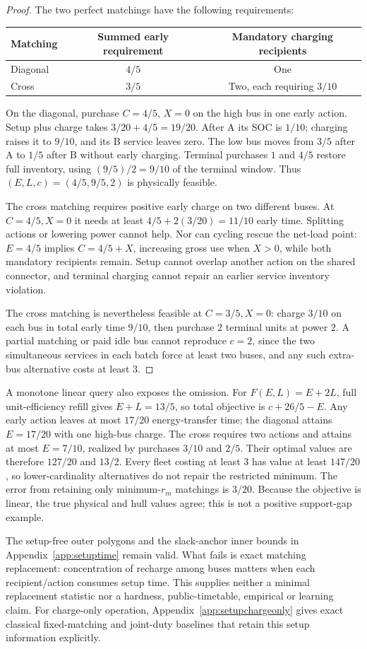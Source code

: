 \begin{proof}
The two perfect matchings have the following requirements:
\begin{center}
\begin{tabular}{lcc}
\toprule
Matching & Summed early requirement & Mandatory charging recipients\\
\midrule
Diagonal & $4/5$ & One\\
Cross & $3/5$ & Two, each requiring $3/10$\\
\bottomrule
\end{tabular}
\end{center}
On the diagonal, purchase $C=4/5$, $X=0$ on the high bus in one
early action. Setup plus charge takes $3/20+4/5=19/20$.
After A its SOC is $1/10$; charging raises it to $9/10$, and its
B service leaves zero. The low bus moves from $3/5$ after A to $1/5$
after B without early charging. Terminal purchases $1$ and $4/5$
restore full inventory, using $(9/5)/2=9/10$ of the terminal window.
Thus $(E,L,c)=(4/5,9/5,2)$ is physically feasible.

The cross matching requires positive early charge on two different buses.
At $C=4/5,X=0$ it needs at least $4/5+2(3/20)=11/10$ early time.
Splitting actions or lowering power cannot help. Nor can cycling rescue
the net-load point: $E=4/5$ implies $C=4/5+X$, increasing gross use
when $X>0$, while both mandatory recipients remain. Setup cannot overlap
another action on the shared connector, and terminal charging cannot
repair an earlier service inventory violation.

The cross matching is nevertheless feasible at $C=3/5,X=0$: charge
$3/10$ on each bus in total early time $9/10$, then purchase $2$ terminal
units at power $2$. A partial matching or paid idle bus cannot reproduce
$c=2$, since the two simultaneous services in each batch force at least
two buses, and any such extra-bus alternative costs at least $3$.
\end{proof}

A monotone linear query also exposes the omission. For $F(E,L)=E+2L$,
full unit-efficiency refill gives $E+L=13/5$, so total objective is
$c+26/5-E$. Any early action leaves at most $17/20$ energy-transfer
time; the diagonal attains $E=17/20$ with one high-bus charge.
The cross requires two actions and attains at most $E=7/10$, realized
by purchases $3/10$ and $2/5$. Their optimal values are therefore
$127/20$ and $13/2$. Every fleet costing at least $3$ has value at least
$147/20$, so lower-cardinality alternatives do not repair the restricted
minimum. The error from retaining only minimum-$r_m$ matchings is $3/20$.
Because the objective is linear, the true physical and hull values agree;
this is not a positive support-gap example.

The setup-free outer polygons and the slack-anchor inner bounds in
Appendix~\ref{app:setuptime} remain valid. What fails is exact matching
replacement: concentration of recharge among buses matters when each
recipient/action consumes setup time. This supplies neither a minimal
replacement statistic nor a hardness, public-timetable, empirical or
learning claim.
For charge-only operation, Appendix~\ref{app:setupchargeonly} gives exact
classical fixed-matching and joint-duty baselines that retain this setup
information explicitly.
